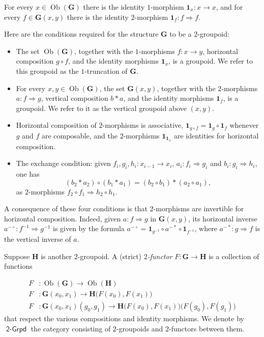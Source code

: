 \documentclass[a4paper,10pt]{amsart}
\theoremstyle{definition}
\numberwithin{equation}{section}
\newcommand{\opn}{\operatorname}
\newcommand{\cat}[1]{\operatorname{\mathsf{#1}}}
\newcommand{\bsym}[1]{\boldsymbol{#1}}
\newcommand{\twoto}{\Rightarrow}
\begin{document}
For every $x \in \opn{Ob}(\bsym{G})$ there is the identity $1$-morphism 
$\bsym{1}_x : x \to x$, and for every 
$f \in \bsym{G}(x, y)$ there is the identity $2$-morphism 
$\bsym{1}_f : f \twoto f$. 

Here are the conditions required for the structure $\bsym{G}$ to be a 
$2$-groupoid: 
\begin{itemize}
\item The set $\opn{Ob}(\bsym{G})$, together with the $1$-morphisms
$f : x \to y$, horizontal composition $g \circ f$, and the identity morphisms 
$\bsym{1}_x$, is a groupoid. 
We refer to this groupoid as the $1$-truncation of $\bsym{G}$. 

\item For every $x, y \in \opn{Ob}(\bsym{G})$, the set 
$\bsym{G}(x,y)$, together with the $2$-morphisms 
$a : f \twoto g$, vertical composition
$b \ast a$, and the identity morphisms $\bsym{1}_f$, is a groupoid. We refer
to it as the vertical groupoid above $(x, y)$. 

\item Horizontal composition of $2$-morphisms is associative, 
$\bsym{1}_{g \circ f} = \bsym{1}_g \circ \bsym{1}_f$ whenever $g$ and $f$ are
composable, and the $2$-morphisms $\bsym{1}_{\bsym{1}_x}$ are identities for
horizontal composition.

\item The exchange condition: given $f_i, g_i, h_i : x_{i-1} \to x_i$,
$a_i : f_i \twoto g_i$ and $b_i : g_i \twoto h_i$, one has
\[ (b_2 \ast a_2) \circ (b_1 \ast a_1) = 
(b_2 \circ b_1) \ast (a_2 \circ a_1) , \]
as $2$-morphisms $f_2 \circ f_1 \twoto h_2 \circ h_1$.
\end{itemize}

A consequence of these four conditions is that $2$-morphisms are invertible for
horizontal composition. Indeed, given $a : f \twoto g$ in 
$\bsym{G}(x, y)$,  its horizontal inverse 
$a^{- \circ} : f^{-1} \twoto g^{-1}$ is given by the formula
$a^{- \circ} = \bsym{1}_{g^{-1}} \circ a^{- \ast} \circ \bsym{1}_{f^{-1}}$,
where 
$a^{- \ast} : g \twoto f$ is the vertical inverse of $a$. 

Suppose $\bsym{H}$ is another $2$-groupoid. A (strict) {\em $2$-functor} 
$F : \bsym{G} \to \bsym{H}$ is a collection of functions 

\[ \begin{aligned}
F & : \opn{Ob}(\bsym{G}) \to \opn{Ob}(\bsym{H})
\\
F & : \bsym{G}(x_0, x_1) \to \bsym{H} \bigl( F(x_0), F(x_1) \bigr)
\\
F & : \bsym{G}(x_0, x_1)(g_0, g_1) \to 
\bsym{H} \bigl( F(x_0), F(x_1) \bigr) \bigl( F(g_0), F(g_1) \bigr) 
\end{aligned} \]
that respect the various compositions and identity morphisms. We denote by
$\cat{2-Grpd}$ the category consisting of $2$-groupoids and $2$-functors between
them.  
\end{document}

